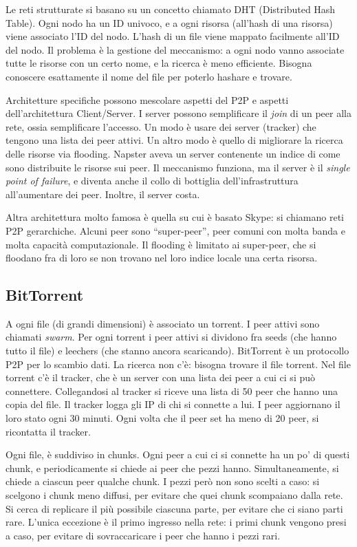Le reti strutturate si basano su un concetto chiamato DHT (Distributed Hash Table). Ogni nodo ha un ID univoco, e a ogni risorsa (all'hash di una risorsa) viene associato l'ID del nodo. L'hash di un file viene mappato facilmente all'ID del nodo. Il problema \`e la gestione del meccanismo: a ogni nodo vanno associate tutte le risorse con un certo nome, e la ricerca \`e meno efficiente. Bisogna conoscere esattamente il nome del file per poterlo hashare e trovare.

Architetture specifiche possono mescolare aspetti del P2P e aspetti dell'architettura Client/Server. I server possono semplificare il \emph{join} di un peer alla rete, ossia semplificare l'accesso. Un modo \`e usare dei server (tracker) che tengono una lista dei peer attivi. Un altro modo \`e quello di migliorare la ricerca delle risorse via flooding. Napster aveva un server contenente un indice di come sono distribuite le risorse sui peer. Il meccanismo funziona, ma il server \`e il \emph{single point of failure}, e diventa anche il collo di bottiglia dell'infrastruttura all'aumentare dei peer. Inoltre, il server costa.

Altra architettura molto famosa \`e quella su cui \`e basato Skype: si chiamano reti P2P gerarchiche. Alcuni peer sono ``super-peer'', peer comuni con molta banda e molta capacit\`a computazionale. Il flooding \`e limitato ai super-peer, che si floodano fra di loro se non trovano nel loro indice locale una certa risorsa.

\subsection{BitTorrent}

A ogni file (di grandi dimensioni) \`e associato un torrent. I peer attivi sono chiamati \emph{swarm}. Per ogni torrent i peer attivi si dividono fra seeds (che hanno tutto il file) e leechers (che stanno ancora scaricando). BitTorrent \`e un protocollo P2P per lo scambio dati. La ricerca non c'\`e: bisogna trovare il file torrent. Nel file torrent c'\`e il tracker, che \`e un server con una lista dei peer a cui ci si pu\`o connettere. Collegandosi al tracker si riceve una lista di 50 peer che hanno una copia del file. Il tracker logga gli IP di chi si connette a lui. I peer aggiornano il loro stato ogni 30 minuti. Ogni volta che il peer set ha meno di 20 peer, si ricontatta il tracker.

Ogni file, \`e suddiviso in chunks. Ogni peer a cui ci si connette ha un po' di questi chunk, e periodicamente si chiede ai peer che pezzi hanno. Simultaneamente, si chiede a ciascun peer qualche chunk. I pezzi per\`o non sono scelti a caso: si scelgono i chunk meno diffusi, per evitare che quei chunk scompaiano dalla rete. Si cerca di replicare il pi\`u possibile ciascuna parte, per evitare che ci siano parti rare. L'unica eccezione \`e il primo ingresso nella rete: i primi chunk vengono presi a caso, per evitare di sovraccaricare i peer che hanno i pezzi rari.

